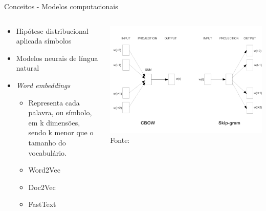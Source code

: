 \begin{frame}{Conceitos - Modelos computacionais}
\selectFont
\begin{columns}
	\begin{column}{0.60\textwidth}
		\begin{tcolorbox}[title=Modelo de representação distribuída,valign=center]\selectFont
			\begin{itemize}
				\item Hipótese distribucional aplicada símbolos
				\item Modelos neurais de língua natural \cite{Bengio2003}
				\item {\it Word embeddings} 
				\begin{itemize}\selectFont
					\item Representa cada palavra, ou símbolo, em k dimensões, sendo k menor que o tamanho do vocabulário.
					\item Word2Vec \cite{Mikolov2013}
					\item Doc2Vec \cite{QuocLe2014}
					\item FastText \cite{bojanowski2017enriching}
				\end{itemize}
			\end{itemize}
		\end{tcolorbox}		
	\end{column}
	\begin{column}{0.40\textwidth}
		\begin{tcolorbox}[title=Modelo Word2Vec,valign=center]\selectFont
			\includegraphics[width=.99\textwidth]{images/efficient-models.pdf}
			Fonte: 
		\end{tcolorbox}		
	\end{column}
\end{columns}

\end{frame}
